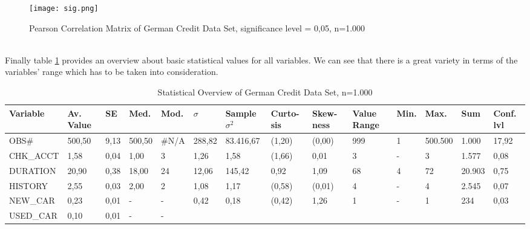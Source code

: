 \begin{figure}[htbp]
	\centering
	\texttt{[image: sig.png]}
	\caption{Pearson Correlation Matrix of German Credit Data Set, significance level = 0,05, n=1.000}
	\label{corrMatrix}
\end{figure}\\
Finally table \ref{overview} provides an overview about basic statistical values for all variables. We can see that there is a great variety in terms of the variables' range which has to be taken into consideration. %
\begin{table}[]
	\centering
	\caption{Statistical Overview of German Credit Data Set, n=1.000}
	\label{overview}
	\begin{tabular}{|p{2.6cm}|p{0.75cm}|p{0.6cm}|p{0.75cm}|p{0.6cm}|p{0.75cm}|p{1.2cm}|p{0.6cm}|p{0.65cm}|p{0.7cm}|p{0.45cm}|p{0.65cm}|p{0.85cm}|p{0.55cm}|}\hline
		{\tiny \textbf{Variable}}
		&{\tiny \textbf{Av. Value}}&{\tiny \textbf{SE}}&{\tiny \textbf{Med.}}&\textbf{{\tiny Mod.}} &\textbf{$\sigma$}&\textbf{{\tiny Sample }}$\sigma^2$&{\tiny\textbf{Curto- sis}}&
		{\tiny\textbf{Skew- ness}}
		&{\tiny \textbf{Value Range}}&{\tiny \textbf{Min.}}&{\tiny \textbf{Max.}}&{\tiny \textbf{Sum}}
		&\textbf{{\tiny Conf. lvl}}\\\hline
		{\tiny OBS\#}
		&{\tiny 500,50}&{\tiny 9,13}&{\tiny 500,50}&{\tiny \#N/A}
		&{\tiny 288,82}&{\tiny 83.416,67}&{\tiny (1,20)}&{\tiny (0,00)}
		&{\tiny 999}&{\tiny 1}&{\tiny 500.500}&{\tiny 1.000}&{\tiny 17,92}\\ \hline
		{\tiny CHK\_ACCT}
		&{\tiny 1,58}&{\tiny 0,04}&{\tiny 1,00}&{\tiny 3}
		&{\tiny 1,26}&{\tiny 1,58}&{\tiny (1,66)}&{\tiny 0,01}
		&{\tiny 3}&{\tiny - }&{\tiny 3}&{\tiny 1.577}&{\tiny 0,08}\\ \hline
		{\tiny DURATION}
		&{\tiny 20,90}&{\tiny 0,38}&{\tiny 18,00}&{\tiny 24}
		&{\tiny 12,06}&{\tiny 145,42}&{\tiny 0,92}&{\tiny 1,09}
		&{\tiny 68}&{\tiny 4}&{\tiny 72}&{\tiny 20.903}&{\tiny 0,75}\\ \hline
		{\tiny HISTORY}
		&{\tiny 2,55}&{\tiny 0,03}&{\tiny 2,00}&{\tiny 2}
		&{\tiny 1,08}&{\tiny 1,17}&{\tiny (0,58)}&{\tiny (0,01)}
		&{\tiny 4}&{\tiny -}&{\tiny 4}&{\tiny 2.545}&{\tiny 0,07}\\ \hline
		{\tiny NEW\_CAR}
		&{\tiny 0,23}&{\tiny 0,01}&{\tiny -}&{\tiny -}
		&{\tiny 0,42}&{\tiny 0,18}&{\tiny (0,42)}&{\tiny 1,26}
		&{\tiny 1}&{\tiny -}&{\tiny 1}&{\tiny 234}&{\tiny 0,03}\\ \hline
		{\tiny USED\_CAR}
		&{\tiny 0,10}&{\tiny 0,01}&{\tiny -}&{\tiny -}

\end{tabular}
\end{table}

